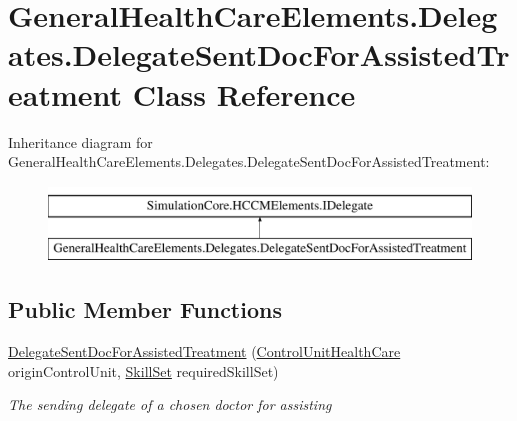 \hypertarget{class_general_health_care_elements_1_1_delegates_1_1_delegate_sent_doc_for_assisted_treatment}{}\section{General\+Health\+Care\+Elements.\+Delegates.\+Delegate\+Sent\+Doc\+For\+Assisted\+Treatment Class Reference}
\label{class_general_health_care_elements_1_1_delegates_1_1_delegate_sent_doc_for_assisted_treatment}
Inheritance diagram for General\+Health\+Care\+Elements.\+Delegates.\+Delegate\+Sent\+Doc\+For\+Assisted\+Treatment\+:\begin{figure}[H]
\begin{center}
\leavevmode
\includegraphics[height=2.000000cm]{class_general_health_care_elements_1_1_delegates_1_1_delegate_sent_doc_for_assisted_treatment}
\end{center}
\end{figure}
\subsection*{Public Member Functions}
\begin{DoxyCompactItemize}
\item 
\hyperlink{class_general_health_care_elements_1_1_delegates_1_1_delegate_sent_doc_for_assisted_treatment_abe4d132506c1f6b43e2ef3220403f683}{Delegate\+Sent\+Doc\+For\+Assisted\+Treatment} (\hyperlink{class_general_health_care_elements_1_1_control_units_1_1_control_unit_health_care}{Control\+Unit\+Health\+Care} origin\+Control\+Unit, \hyperlink{class_simulation_core_1_1_h_c_c_m_elements_1_1_skill_set}{Skill\+Set} required\+Skill\+Set)
\begin{DoxyCompactList}\small\item\em The sending delegate of a chosen doctor for assisting \end{DoxyCompactList}\end{DoxyCompactItemize}
